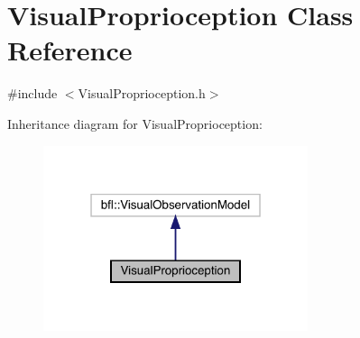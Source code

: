 \hypertarget{classVisualProprioception}{}\section{Visual\+Proprioception Class Reference}
\label{classVisualProprioception}


{\ttfamily \#include $<$Visual\+Proprioception.\+h$>$}



Inheritance diagram for Visual\+Proprioception\+:
\nopagebreak
\begin{figure}[H]
\begin{center}
\leavevmode
\includegraphics[width=220pt]{classVisualProprioception__inherit__graph}
\end{center}
\end{figure}

